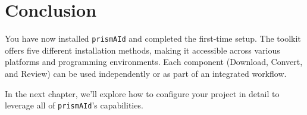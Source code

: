\section{Conclusion}

You have now installed \texttt{prismAId} and completed the first-time setup. The toolkit offers five different installation methods, making it accessible across various platforms and programming environments. Each component (Download, Convert, and Review) can be used independently or as part of an integrated workflow.

In the next chapter, we'll explore how to configure your project in detail to leverage all of \texttt{prismAId}'s capabilities.

